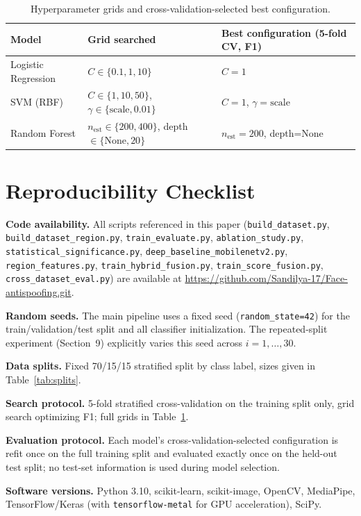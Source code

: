 \documentclass[11pt]{article}
\begin{document}
\begin{table}[htbp]
\centering
\caption{Hyperparameter grids and cross-validation-selected best configuration.}
\label{tab:hyperparams}
\begin{tabular}{lll}
\toprule
Model & Grid searched & Best configuration (5-fold CV, F1) \\
\midrule
Logistic Regression & $C\in\{0.1,1,10\}$ & $C=1$ \\
SVM (RBF) & $C\in\{1,10,50\}$, $\gamma\in\{\text{scale},0.01\}$ & $C=1$, $\gamma=\text{scale}$ \\
Random Forest & $n_{\text{est}}\in\{200,400\}$, depth$\in\{\text{None},20\}$ & $n_{\text{est}}=200$, depth=None \\
\bottomrule
\end{tabular}
\end{table}

\section{Reproducibility Checklist}

\textbf{Code availability.} All scripts referenced in this paper (\texttt{build\_dataset.py}, \texttt{build\_dataset\_region.py}, \texttt{train\_evaluate.py}, \texttt{ablation\_study.py}, \texttt{statistical\_significance.py}, \texttt{deep\_baseline\_mobilenetv2.py}, \texttt{region\_features.py}, \texttt{train\_hybrid\_fusion.py}, \texttt{train\_score\_fusion.py}, \texttt{cross\_dataset\_eval.py}) are available at \url{https://github.com/Sandilya-17/Face-antispoofing.git}.

\textbf{Random seeds.} The main pipeline uses a fixed seed (\texttt{random\_state=42}) for the train/validation/test split and all classifier initialization. The repeated-split experiment (Section~9) explicitly varies this seed across $i=1,\ldots,30$.

\textbf{Data splits.} Fixed 70/15/15 stratified split by class label, sizes given in Table~\ref{tab:splits}.

\textbf{Search protocol.} 5-fold stratified cross-validation on the training split only, grid search optimizing F1; full grids in Table~\ref{tab:hyperparams}.

\textbf{Evaluation protocol.} Each model's cross-validation-selected configuration is refit once on the full training split and evaluated exactly once on the held-out test split; no test-set information is used during model selection.

\textbf{Software versions.} Python 3.10, scikit-learn, scikit-image, OpenCV, MediaPipe, TensorFlow/Keras (with \texttt{tensorflow-metal} for GPU acceleration), SciPy.
\end{document}
